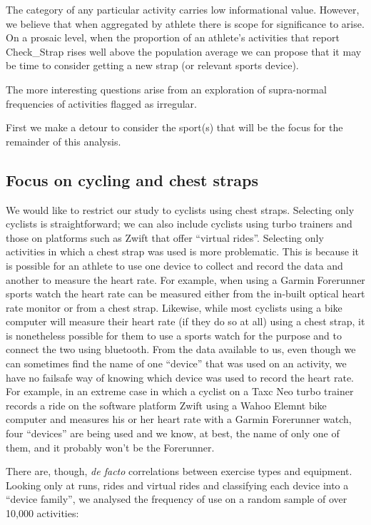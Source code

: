 \documentclass[
  letterpaper,
  DIV=11,
  numbers=noendperiod]{scrartcl}
\begin{document}
The category of any particular activity carries low informational value.
However, we believe that when aggregated by athlete there is scope for
significance to arise. On a prosaic level, when the proportion of an
athlete's activities that report Check\_Strap rises well above the
population average we can propose that it may be time to consider
getting a new strap (or relevant sports device).

The more interesting questions arise from an exploration of supra-normal
frequencies of activities flagged as irregular.

First we make a detour to consider the sport(s) that will be the focus
for the remainder of this analysis.

\subsection{Focus on cycling and chest
straps}\label{focus-on-cycling-and-chest-straps}

We would like to restrict our study to cyclists using chest straps.
Selecting only cyclists is straightforward; we can also include cyclists
using turbo trainers and those on platforms such as Zwift that offer
``virtual rides''. Selecting only activities in which a chest strap was
used is more problematic. This is because it is possible for an athlete
to use one device to collect and record the data and another to measure
the heart rate. For example, when using a Garmin Forerunner sports watch
the heart rate can be measured either from the in-built optical heart
rate monitor or from a chest strap. Likewise, while most cyclists using
a bike computer will measure their heart rate (if they do so at all)
using a chest strap, it is nonetheless possible for them to use a sports
watch for the purpose and to connect the two using bluetooth. From the
data available to us, even though we can sometimes find the name of one
``device'' that was used on an activity, we have no failsafe way of
knowing which device was used to record the heart rate. For example, in
an extreme case in which a cyclist on a Taxc Neo turbo trainer records a
ride on the software platform Zwift using a Wahoo Elemnt bike computer
and measures his or her heart rate with a Garmin Forerunner watch, four
``devices'' are being used and we know, at best, the name of only one of
them, and it probably won't be the Forerunner.

There are, though, \emph{de facto} correlations between exercise types
and equipment. Looking only at runs, rides and virtual rides and
classifying each device into a ``device family'', we analysed the
frequency of use on a random sample of over 10,000 activities:
\end{document}
